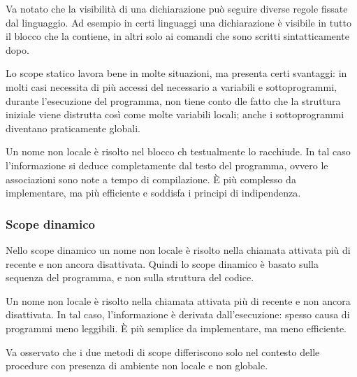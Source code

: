 \documentclass[oneside,a4paper,11pt]{book}
\theoremstyle{italicstyle}
\theoremstyle{normStyle}
\begin{document}
Va notato che la visibilità di una dichiarazione  può seguire diverse regole fissate dal 
linguaggio. Ad esempio in certi linguaggi una dichiarazione è visibile in tutto il blocco che la contiene, in altri solo ai 
comandi che sono scritti sintatticamente dopo.

Lo scope statico lavora bene in molte situazioni, ma presenta certi svantaggi:
in molti casi necessita di più accessi del necessario a variabili e sottoprogrammi, 
durante l'esecuzione del programma, non tiene conto dle fatto che la struttura iniziale 
viene distrutta così come molte variabili locali; anche i sottoprogrammi diventano praticamente 
globali.
\begin{tcolorbox}[title = {Scope statico}]
  Un nome non locale è risolto nel blocco ch testualmente lo racchiude. In tal caso l'informazione si deduce completamente dal testo del 
  programma, ovvero le associazioni sono note a tempo di compilazione. 
  È più complesso da implementare, ma più efficiente e soddisfa i principi di 
  indipendenza.
\end{tcolorbox}
\subsubsection{Scope dinamico}
Nello scope dinamico un nome non locale è risolto nella chiamata attivata più 
di recente e non ancora disattivata. Quindi lo scope dinamico è basato sulla sequenza del 
programma, e non sulla struttura del codice.
\begin{tcolorbox}[title = {Scope dinamico}]
  Un nome non locale è risolto nella chiamata attivata più di recente 
  e non ancora disattivata. In tal caso, l'informazione è derivata dall'esecuzione:
  spesso causa di programmi meno leggibili. È più semplice da implementare, ma meno efficiente.
\end{tcolorbox}
Va osservato che i due metodi di scope differiscono solo nel contesto delle procedure con presenza 
di ambiente non locale e non globale.
\end{document}
